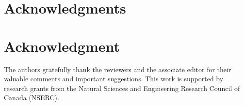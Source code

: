 \documentclass[a4paper,conference]{IEEEtran}
\begin{document}
\ifCLASSOPTIONcompsoc
\section*{Acknowledgments}
\else
  \section*{Acknowledgment}
\fi

The authors gratefully thank the reviewers and the associate editor for their valuable comments and important suggestions. This work is supported by research grants from the Natural Sciences and Engineering Research Council of Canada (NSERC).

























\balance 

\end{document}

